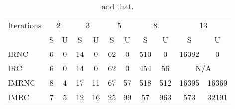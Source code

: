 \begin{table}[t]
	\centering
	\small
	\begin{tabular*}{0.8\textwidth}{@{\extracolsep{\fill}} lcccccccccc}
		\hline
		Iterations & \multicolumn{2}{c}{2} & \multicolumn{2}{c}{3} & \multicolumn{2}{c}{5} & \multicolumn{2}{c}{8} & \multicolumn{2}{c}{13} \\
		& S & U & S & U & S & U & S & U & S & U \\		
		\hline\hline
		IRNC   & 6 & 0 & 14 & 0  & 62 & 0  & 510 & 0   & 16382 & 0               \\
		IRC    & 6 & 0 & 14 & 0  & 62 & 0  & 454 & 56  & \multicolumn{2}{c}{N/A} \\
		IMRNC  & 8 & 4 & 17 & 11 & 67 & 57 & 518 & 512 & 16395 & 16369           \\
		IMRC   & 7 & 5 & 12 & 16 & 25 & 99 & 57  & 963 & 573   & 32191           \\
		\hline	
	\end{tabular*}
	\caption[This]{and that.}
	\label{tab:evaluation:quantitative-path-conditions}
\end{table} 